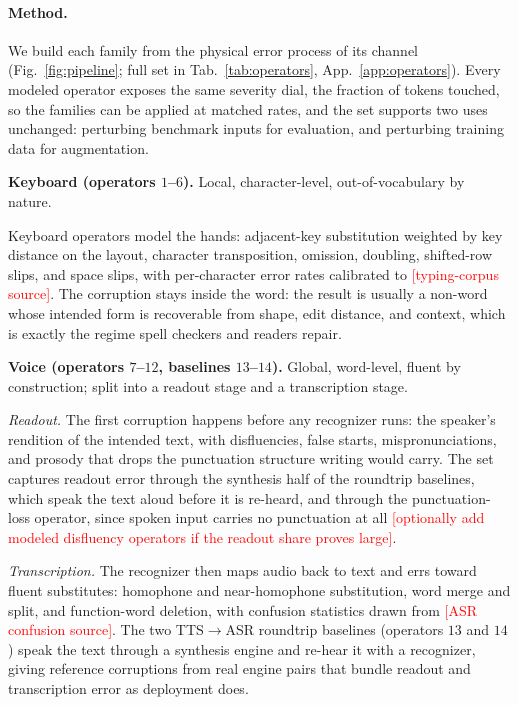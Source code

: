 \documentclass[11pt]{article}
\newcommand{\todo}[1]{\textcolor{red}{[#1]}}
\begin{document}
\paragraph{Method.} We build each family from the physical error process of its channel
(Fig.~\ref{fig:pipeline}; full set in Tab.~\ref{tab:operators}, App.~\ref{app:operators}).
Every modeled operator exposes the same severity dial, the fraction of tokens touched, so the
families can be applied at matched rates, and the set supports two uses unchanged: perturbing
benchmark inputs for evaluation, and perturbing training data for augmentation.

\begin{modbox}
\textbf{Keyboard (operators $1$--$6$).} Local, character-level, out-of-vocabulary by nature.
\end{modbox}

Keyboard operators model the hands: adjacent-key substitution weighted by key distance on the
layout, character transposition, omission, doubling, shifted-row slips, and space slips, with
per-character error rates calibrated to \todo{typing-corpus source}. The corruption stays inside
the word: the result is usually a non-word whose intended form is recoverable from shape, edit
distance, and context, which is exactly the regime spell checkers and readers repair.

\begin{modbox}
\textbf{Voice (operators $7$--$12$, baselines $13$--$14$).} Global, word-level, fluent by
construction; split into a readout stage and a transcription stage.
\end{modbox}

\emph{Readout.} The first corruption happens before any recognizer runs: the speaker's rendition
of the intended text, with disfluencies, false starts, mispronunciations, and prosody that drops
the punctuation structure writing would carry. The set captures readout error through the
synthesis half of the roundtrip baselines, which speak the text aloud before it is re-heard, and
through the punctuation-loss operator, since spoken input carries no punctuation at all
\todo{optionally add modeled disfluency operators if the readout share proves large}.

\emph{Transcription.} The recognizer then maps audio back to text and errs toward fluent
substitutes: homophone and near-homophone substitution, word merge and split, and function-word
deletion, with confusion statistics drawn from \todo{ASR confusion source}. The two TTS$\to$ASR
roundtrip baselines (operators $13$ and $14$) speak the text through a synthesis engine and
re-hear it with a recognizer, giving reference corruptions from real engine pairs that bundle
readout and transcription error as deployment does.
\end{document}
